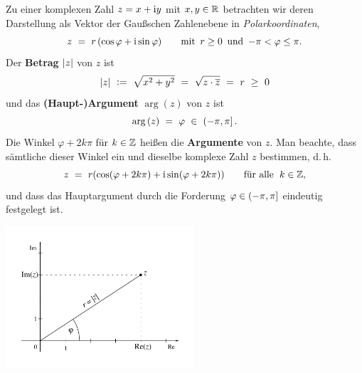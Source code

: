 Zu einer komplexen Zahl $z=x+\mathrm{i} y$ mit $x,y\in\mathbb{R}$ betrachten wir deren
Darstellung als Vektor der Gaußschen Zahlenebene in \emph{Polarkoordinaten},
\[
z
\ =\ r\,(\cos\varphi+\mathrm{i}\sin\varphi)
\qquad\text{mit \,$r\ge0$\, und \,$-\pi<\varphi\le\pi$.}
\]
Der \textbf{Betrag} $\lvert z\rvert$ von $z$ ist
\[
\lvert z\rvert
\ \mathrel{\mathop:}=\ \sqrt{x^2+y^2}
\ =\ \sqrt{z\cdot\overline{z}}
\ =\ r
\ \ge\ 0
\]
und das \textbf{(Haupt-)Argument} $\arg(z)$ von $z$ ist
\[
\arg{(z)}
\ =\ \varphi
\ \in\ ({-\pi},{\pi}]
\,.
\]
Die Winkel $\varphi+2k\pi$ für $k\in\mathbb{Z}$ heißen die \textbf{Argumente}
von $z$. Man beachte, dass sämtliche dieser Winkel ein und dieselbe komplexe
Zahl $z$ bestimmen, d.\,h.
\[
z
\ =\ r(\cos(\varphi+2k\pi)+\mathrm{i}\sin(\varphi+2k\pi))
\qquad\text{für alle \;$k\in\mathbb{Z}$,}
\]
und dass das Hauptargument durch die Forderung $\varphi\in({-\pi},{\pi}]$ eindeutig festgelegt ist.

\centerline{\includegraphics[width=7cm]{img/complex2}}

